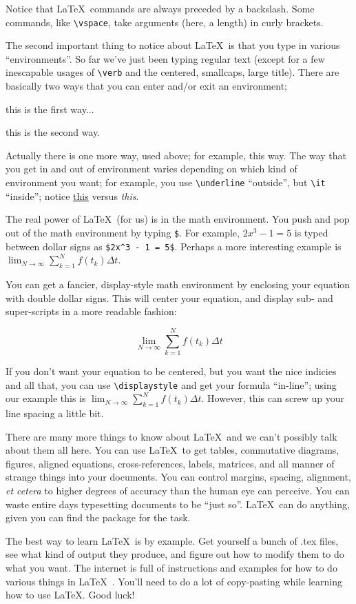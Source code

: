 Notice that \LaTeX\ commands are always preceded by a backslash.
Some commands, like \verb|\vspace|, take arguments (here, a length) in curly brackets.

The second important thing to notice about \LaTeX\ is that you type in various ``environments''.
So far we've just been typing regular text (except for a few inescapable usages of \verb|\verb| and the centered, smallcaps, large title).
There are basically two ways that you can enter and/or exit an environment;
\vspace{0pc}

\centerline{this is the first way...}

\begin{center}
	this is the second way.
\end{center}

\noindent Actually there is one more way, used above; for example, {\sc this way}.
The way that you get in and out of environment varies depending on which kind of environment you want; for example, you use \verb|\underline| ``outside'', but \verb|\it| ``inside''; notice \underline{this} versus {\it this}.

The real power of \LaTeX\ (for us) is in the math environment.
You push and pop out of the math environment by typing \verb|$|.
For example, $2x^3 - 1 = 5$ is typed between dollar signs as \verb|$2x^3 - 1 = 5$|.
Perhaps a more interesting example is $\lim_{N \to \infty} \sum_{k=1}^N f(t_k) \Delta t$.

You can get a fancier, display-style math environment by enclosing your equation with double dollar signs.
This will center your equation, and display sub- and super-scripts in a more readable fashion:

$$\lim_{N \to \infty} \sum_{k=1}^N f(t_k) \Delta t$$

If you don't want your equation to be centered, but you want the nice indicies and all that, you can use \verb|\displaystyle| and get your formula ``in-line''; using our example this is $\displaystyle \lim_{N \to \infty} \sum_{k=1}^N f(t_k) \Delta t$.
However, this can screw up your line spacing a little bit.

There are many more things to know about \LaTeX\ and we can't possibly talk about them all here.
You can use \LaTeX\ to get tables, commutative diagrams, figures, aligned equations, cross-references, labels, matrices, and all manner of strange things into your documents.
You can control margins, spacing, alignment, {\it et cetera} to higher degrees of accuracy than the human eye can perceive.
You can waste entire days typesetting documents to be ``just so''.
\LaTeX\ can do anything, given you can find the package for the task.

The best way to learn \LaTeX\ is by example.
Get yourself a bunch of .tex files, see what kind of output they produce, and figure out how to modify them to do what you want.
The internet is full of instructions and examples for how to do various things in \LaTeX\ \parencite{tex-google}.
You'll need to do a lot of copy-pasting while learning how to use \LaTeX.
Good luck!

